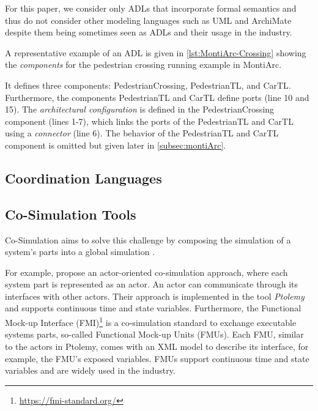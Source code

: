 \documentclass[runningheads]{llncs}
\begin{document}
For this paper, we consider only ADLs that incorporate formal semantics and thus do not consider other modeling languages such as UML \cite{objectmanagementgroupUnifiedModelingLanguage2017} and ArchiMate \cite{theopengroupArchiMateSpecification2023} despite them being sometimes seen as ADLs and their usage in the industry.

A representative example of an ADL is given in  \autoref{lst:MontiArc-Crossing} showing the \textit{components} for the pedestrian crossing running example in MontiArc.



It defines three components: \textsf{PedestrianCrossing}, \textsf{PedestrianTL}, and \textsf{CarTL}.
Furthermore, the components \textsf{PedestrianTL} and \textsf{CarTL} define ports (line 10 and 15).
The \textit{architectural configuration} is defined in the \textsf{PedestrianCrossing} component (lines 1-7), which links the ports of the \textsf{PedestrianTL} and \textsf{CarTL} using a \textit{connector} (line 6).
The behavior of the \textsf{PedestrianTL} and \textsf{CarTL} component is omitted but given later in \autoref{subsec:montiArc}.

\subsection{Coordination Languages}

\subsection{Co-Simulation Tools}
\cite{gomesCoSimulationSurvey2019}

Co-Simulation aims to solve this challenge by composing the simulation of a system's parts into a global simulation \cite{gomesCoSimulationSurvey2019}.

For example, \cite{ekerTamingHeterogeneityPtolemy2003} propose an actor-oriented co-simulation approach, where each system part is represented as an actor.
An actor can communicate through its interfaces with other actors.
Their approach is implemented in the tool \textit{Ptolemy} and supports continuous time and state variables.
Furthermore, the Functional Mock-up Interface (FMI)\footnote{\url{https://fmi-standard.org/}} is a co-simulation standard to exchange executable systems parts, so-called Functional Mock-up Units (FMUs).
Each FMU, similar to the actors in Ptolemy, comes with an XML model to describe its interface, for example, the FMU's exposed variables.
FMUs support continuous time and state variables and are widely used in the industry.
\end{document}

